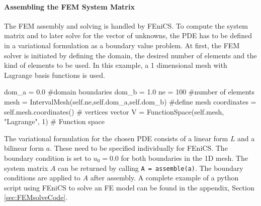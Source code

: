 \documentclass[%
  a4paper,oneside,%
  11pt,%
  smallchapters,
  style=printdev,
  extramargin,
  green,%
  rgb, <cmyk>
  ]{tubsbook}
\begin{document}
\paragraph{Assembling the FEM System Matrix}
The FEM assembly and solving is handled by FEniCS. To compute the system matrix and to later solve for the vector of unknowns, the PDE has to be defined in a variational formulation as a boundary value problem.
At first, the FEM solver is initiated by defining the domain, the desired number of elements and the kind of elements to be used. In this example, a 1 dimensional mesh with Lagrange basis functions is used.
\begin{python}
dom_a = 0.0 #domain boundaries
dom_b = 1.0
ne	= 100 #number of elements
mesh = IntervalMesh(self.ne,self.dom_a,self.dom_b) #define mesh
coordinates = self.mesh.coordinates() # vertices vector
V = FunctionSpace(self.mesh, "Lagrange", 1) # Function space
\end{python}
The variational formulation for the chosen PDE consists of a linear form $L$ and a bilinear form $a$. These need to be specified individually for FEniCS. The boundary condition is set to $u_0 = 0.0$ for both boundaries in the 1D mesh. The system matrix $A$ can be returned by calling \texttt{A = assemble(a)}. The boundary conditions are applied to $A$ after assembly. A complete example of a python script using FEniCS to solve an FE model can be found in the appendix, Section \ref{sec:FEMsolveCode}.
\end{document}

